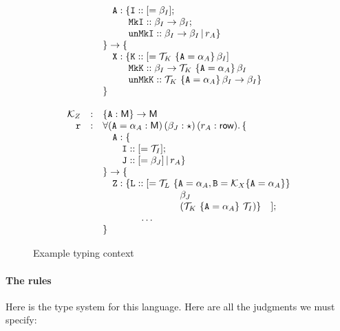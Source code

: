 \documentclass{article}
\begin{document}
\begin{figure}[H]
\[\begin{array}{rcl}
&& \quad\mathtt{A} : \{ \mathtt{I} :: [= \beta_I]; \\
&& \quad\quad~~\mathtt{MkI} :: \beta_I \rightarrow \beta_I; \\
&& \quad\quad~~\mathtt{unMkI} :: \beta_I \rightarrow \beta_I \,|\, r_A \} \\
&& \} \rightarrow \{ \\
&& \quad\mathtt{X} : \{ \mathtt{K} :: [= \mathcal{T}_K~ \{\mathtt{A} = \alpha_A\}\, \beta_I] \\
&& \quad\quad~~\mathtt{MkK} :: \beta_I \rightarrow \mathcal{T}_K~\{\mathtt{A} = \alpha_A\}\, \beta_I \\
&& \quad\quad~~\mathtt{unMkK} :: \mathcal{T}_K~\{\mathtt{A} = \alpha_A\}\, \beta_I \rightarrow \beta_I \}\\
&& \} \\
\\
\mathcal{K}_Z &:& \{ \mathtt{A} : \mathsf{M} \} \rightarrow \mathsf{M} \\
\mbox{\texttt{r}} &:& \forall (\mathtt{A} = \alpha_A : \mathsf{M})\, (\beta_J : \star)\, (r_A : \textsf{row}). \, \{ \\
&& \quad\mathtt{A} : \{ \\
&& \quad\quad \mathtt{I} :: [= \mathcal{T}_I]; \\
&& \quad\quad \mathtt{J} :: [= \beta_J] \,|\, r_A \} \\
&& \} \rightarrow \{ \\
&& \quad\mathtt{Z} : \{ \mathtt{L} :: [= \mathcal{T}_L~\{\mathtt{A} = \alpha_A, \mathtt{B} = \mathcal{K}_X \{\mathtt{A} = \alpha_A\}\} \\
&& \qquad\qquad\qquad\qquad \beta_J \\
&& \qquad\qquad\qquad\qquad (\mathcal{T}_K~\{\mathtt{A} = \alpha_A\}~\mathcal{T}_I) \} \quad ]; \\
&& \qquad\qquad \ldots \\
&& \} \\
\end{array}
\]
\caption{Example typing context}
\end{figure}

\paragraph{The rules}

Here is the type system for this language.  Here are all the judgments
we must specify:
\end{document}
